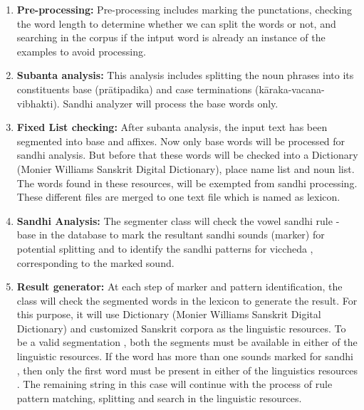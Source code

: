 \documentclass[11pt]{article}
\begin{document}
\begin{enumerate}
	
	\item \textbf{Pre-processing:}
	Pre-processing includes marking the punctations, checking the word length to determine whether we can split the words or not, and searching in the corpus if the intput word is already an instance of the examples to avoid processing.
	
	\item \textbf{Subanta analysis:}
	This analysis includes splitting the noun phrases into its constituents base (prātipadika) and case terminations (kāraka-vacana-vibhakti).  Sandhi analyzer  will  process  the  base  words only. 
	
	\item \textbf{Fixed List checking:}
	 After  subanta analysis, the input text has been segmented into base and affixes. Now only  base  words  will  be  processed  for  sandhi analysis.  But  before  that  these  words  will  be  checked  into  a Dictionary (Monier Williams Sanskrit Digital Dictionary),  place  name  list  and  noun  list.  The  words  found  in  these  resources, will  be exempted  from  sandhi processing. These different files are  merged to  one text file which is named as lexicon.
	
	\item \textbf{Sandhi Analysis:}
	The segmenter class will check the  vowel sandhi rule - base in the database to mark the resultant  sandhi sounds  (marker)  for  potential  splitting  and  to  identify  the  sandhi patterns  for  viccheda , corresponding to the marked sound. 
	
	
	\item \textbf{Result generator:}
	At  each  step  of  marker  and  pattern  identification,  the  class  will  check  the  segmented  words  in  the  lexicon  to  generate  the  result.  For  this  purpose,  it  will  use  Dictionary (Monier Williams Sanskrit Digital Dictionary)  and  customized Sanskrit corpora as the linguistic resources. To be a valid segmentation , both  the segments must be available in either of the linguistic resources. If the word has more  than one sounds marked for  sandhi , then only the first word must be present in either of  the linguistics resources . The remaining string in this case will continue with the process  of rule pattern matching, splitting and search in the linguistic resources.
\end{enumerate}
	
\end{document}
